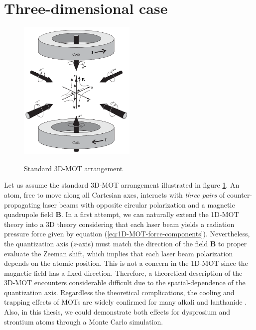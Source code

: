 %
\section{Three-dimensional case}
\label{eq:three-dimensional-case}
%
\begin{figure}[!ht]
	\centering
	\caption{Standard 3D-MOT arrangement}
	\includegraphics[width=0.5\textwidth]{USPSC-img/standard-3D-MOT-arrangement.png}
	\label{fig:standard-3D-MOT-arrangement}
	\vspace{-20pt}
\end{figure}

Let us assume the standard 3D-MOT arrangement illustrated in figure \ref{fig:standard-3D-MOT-arrangement}. An atom, free to move along all Cartesian axes, interacts with \textit{three pairs} of counter-propagating laser beams with opposite circular polarization and a magnetic quadrupole field $ \mathbf{B} $. In a first attempt, we can naturally extend the 1D-MOT theory into a 3D theory considering that each laser beam yields a radiation pressure force given by equation (\ref{eq:1D-MOT-force-components}). Nevertheless, the quantization axis ($z$-axis) must match the direction of the field $ \mathbf{B} $ to proper evaluate the Zeeman shift, which implies that each laser beam polarization depends on the atomic position. This is not a concern in the 1D-MOT since the magnetic field has a fixed direction. Therefore, a theoretical description of the 3D-MOT \cite{prudnikov2015three} encounters considerable difficult due to the spatial-dependence of the quantization axis. Regardless the theoretical complications, the cooling and trapping effects of MOTs are widely confirmed for many alkali \cite{raab1987trapping, katori1999magneto, zachorowski1998magneto} and lanthanide \cite{maier2014narrow, miyazawa2021narrow, frisch2012narrow}. Also, in this thesis, we could demonstrate both effects for dysprosium and strontium atoms through a Monte Carlo simulation.


